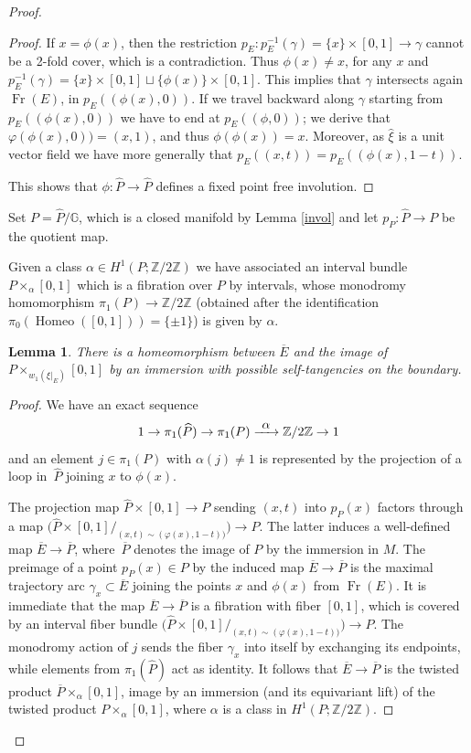 \documentclass[JEP,XML,SOM,Unicode]{cedram}
\DeclareMathOperator{\Fr}{Fr}
\DeclareMathOperator{\Homeo}{Homeo}
\newcommand{\To}[1]{\mathchoice{\xrightarrow{\textstyle\kern4pt#1\kern3pt}}{\stackrel{#1}{\longrightarrow}}{}{}}
\newtheorem{lemma}[theorem]{Lemma}
\theoremstyle{definition}
\theoremstyle{remark}
\numberwithin{equation}{section}
\newcommand{\ZZ}{\mathbb Z}
\begin{document}
\begin{proof}
\begin{proof}
If $x=\phi(x)$, then the restriction $p_E: p_E^{-1}(\gamma)=\{x\}\times [0,1]\to \gamma$
cannot be a 2-fold cover, which is a contradiction. Thus $\phi(x)\neq x$, for any $x$ and
$p_E^{-1}(\gamma)=\{x\}\times [0,1]\sqcup \{\phi(x)\}\times [0,1]$. This implies that $\gamma$ intersects again
$\Fr(E)$, in $p_E((\phi(x),0))$.
If we travel backward along $\gamma$ starting from $p_E((\phi(x),0))$ we have to end at
$p_E((\phi,0))$; we derive that $\varphi(\phi(x),0))=(x,1)$, and thus $\phi(\phi(x))=x$.
Moreover, as $\widehat{\xi}$ is a unit vector field we have more generally that $p_E((x,t))=p_E((\phi(x),1-t))$.

This shows that $\phi:\widehat{P}\to\widehat{P}$ defines a fixed point free involution.
\end{proof}

Set $P=\widehat{P}/\mathbb G$, which is a closed manifold by Lemma \ref{invol} and let
$p_P:\widehat{P}\to P$ be the quotient map.

Given a class $\alpha\in H^1(P;\ZZ/2\ZZ)$ we have associated an interval bundle $P\times_{\alpha} [0,1]$
which is a fibration over $P$ by intervals, whose monodromy homomorphism $\pi_1(P)\to \ZZ/2\ZZ$ (obtained after
the identification $\pi_0(\Homeo([0,1]))=\{\pm 1\}$) is given by $\alpha$.

\begin{lemma}
There is a homeomorphism between $\overline{E}$ and the image of
\hbox{$\!P\!\times_{w_1(\xi|_E)}\!\![0,1]$} by an immersion with possible self-tangencies on the boundary.
\end{lemma}
\begin{proof}
We have an exact sequence
\[ 1\to \pi_1(\widehat{P})\to \pi_1(P)\To{\alpha} \ZZ/2\ZZ\to 1\]
and an element $j\in \pi_1(P)$ with $\alpha(j)\neq 1$ is represented by the projection of a loop in~$\widehat{P}$
joining $x$ to $\phi(x)$.

The projection map $\widehat{P}\times [0,1]\to P$ sending $(x,t)$ into $p_P(x)$ factors through a map
$\bigl(\widehat{P}\times [0,1]/_{(x,t)\sim (\varphi(x),1-t))}\bigr)\to P$. The latter induces
a well-defined map $\overline{E}\to \overline{P}$, where~$\overline{P}$ denotes the image of
$P$ by the immersion in $M$. The preimage of a point $p_P(x)\in P$ by the
induced map $\overline{E}\to \overline{P}$ is the maximal trajectory arc
$\gamma_x\subset \overline{E}$ joining the points
$x$ and $\phi(x)$ from $\Fr(E)$. It is immediate that the map $\overline{E}\to \overline{P}$
is a fibration with fiber $[0,1]$, which is covered by an interval
fiber bundle \hbox{$\bigl(\widehat{P}\times [0,1]/_{(x,t)\sim (\varphi(x),1-t))}\bigr)\to P$}.
The monodromy action of $j$ sends the fiber $\gamma_x$ into itself by exchanging its endpoints, while elements from $\pi_1(\widehat{P})$ act as identity. It follows that $\overline{E}\to \overline{P}$ is the twisted product $\overline{P}\times_{\alpha} [0,1]$, image by an immersion (and its equivariant lift) of the twisted product
$P\times_{\alpha} [0,1]$, where $\alpha$ is a class in $H^1(P;\ZZ/2\ZZ)$.


\end{proof}
\end{proof}
\end{document}
